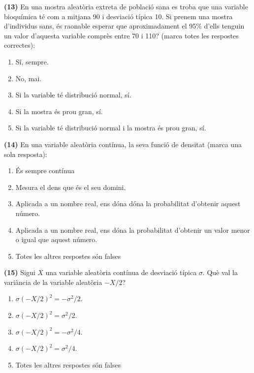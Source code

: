 \documentclass[
]{book}
\providecommand{\tightlist}{%
  \setlength{\itemsep}{0pt}\setlength{\parskip}{0pt}}
\theoremstyle{definition}
\theoremstyle{definition}
\theoremstyle{definition}
\theoremstyle{remark}
\begin{document}
\textbf{(13)} En una mostra aleatòria extreta de població sana es troba que una variable bioquímica té com a mitjana 90 i desviació típica 10. Si prenem una mostra d'individus sans, és raonable esperar que aproximadament el 95\% d'ells tenguin un valor d'aquesta variable comprès entre 70 i 110? (marca totes les respostes correctes):

\begin{enumerate}
\def\labelenumi{\arabic{enumi}.}
\tightlist
\item
  Sí, sempre.
\item
  No, mai.
\item
  Si la variable té distribució normal, sí.
\item
  Si la mostra és prou gran, sí.
\item
  Si la variable té distribució normal i la mostra és prou gran, sí.
\end{enumerate}

\textbf{(14)} En una variable aleatòria contínua, la seva funció de densitat (marca una sola resposta):

\begin{enumerate}
\def\labelenumi{\arabic{enumi}.}
\tightlist
\item
  És sempre contínua
\item
  Mesura el dens que és el seu domini.
\item
  Aplicada a un nombre real, ens dóna dóna la probabilitat d'obtenir aquest número.
\item
  Aplicada a un nombre real, ens dóna la probabilitat d'obtenir un valor menor o igual que aquest número.
\item
  Totes les altres respostes són falses
\end{enumerate}

\textbf{(15)} Sigui \(X\) una variable aleatòria contínua de desviació típica \(\sigma\). Què val la variància de la variable aleatòria \(-X/2\)?

\begin{enumerate}
\def\labelenumi{\arabic{enumi}.}
\tightlist
\item
  \(\sigma(-X/2)^2=-\sigma^2/2\).
\item
  \(\sigma(-X/2)^2=\sigma^2/2\).
\item
  \(\sigma(-X/2)^2=-\sigma^2/4\).
\item
  \(\sigma(-X/2)^2=\sigma^2/4\).
\item
  Totes les altres respostes són falses
\end{enumerate}
\end{document}

